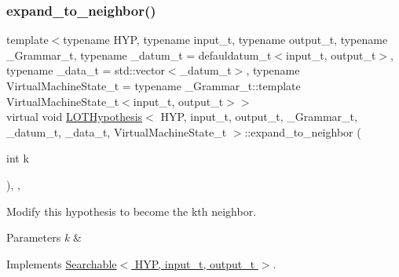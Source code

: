 \subsubsection{\texorpdfstring{expand\+\_\+to\+\_\+neighbor()}{expand\_to\_neighbor()}}
{\footnotesize\ttfamily template$<$typename H\+YP, typename input\+\_\+t, typename output\+\_\+t, typename \+\_\+\+Grammar\+\_\+t, typename \+\_\+datum\+\_\+t = defauldatum\+\_\+t$<$input\+\_\+t, output\+\_\+t$>$, typename \+\_\+data\+\_\+t = std\+::vector$<$\+\_\+datum\+\_\+t$>$, typename Virtual\+Machine\+State\+\_\+t = typename \+\_\+\+Grammar\+\_\+t\+::template Virtual\+Machine\+State\+\_\+t$<$input\+\_\+t, output\+\_\+t$>$$>$ \\
virtual void \hyperlink{class_l_o_t_hypothesis}{L\+O\+T\+Hypothesis}$<$ H\+YP, input\+\_\+t, output\+\_\+t, \+\_\+\+Grammar\+\_\+t, \+\_\+datum\+\_\+t, \+\_\+data\+\_\+t, Virtual\+Machine\+State\+\_\+t $>$\+::expand\+\_\+to\+\_\+neighbor (\begin{DoxyParamCaption}\item[{int}]{k }\end{DoxyParamCaption})\hspace{0.3cm}{\ttfamily [inline]}, {\ttfamily [override]}, {\ttfamily [virtual]}}



Modify this hypothesis to become the k\textquotesingle{}th neighbor. 


\begin{DoxyParams}{Parameters}
{\em k} & \\
\hline
\end{DoxyParams}


Implements \hyperlink{class_searchable_a1786307b9f2dadc8c66c94adef220270}{Searchable$<$ H\+Y\+P, input\+\_\+t, output\+\_\+t $>$}.

\mbox{\label{class_l_o_t_hypothesis_aa1e3f898618de841bfd8c9279a107211}} 
